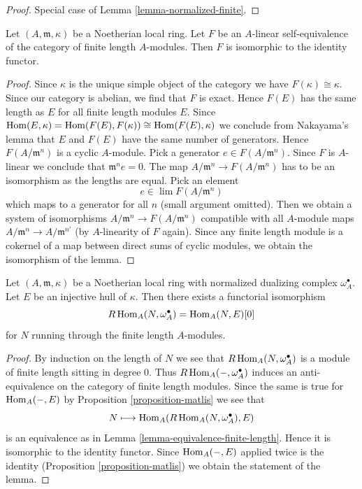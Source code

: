 \begin{proof}
Special case of Lemma \ref{lemma-normalized-finite}.
\end{proof}

\begin{lemma}
\label{lemma-equivalence-finite-length}
Let $(A, \mathfrak m, \kappa)$ be a Noetherian local
ring. Let $F$ be an $A$-linear self-equivalence of the category of
finite length $A$-modules. Then $F$ is isomorphic to the identity functor.
\end{lemma}

\begin{proof}
Since $\kappa$ is the unique simple object of the category we have
$F(\kappa) \cong \kappa$. Since our category is abelian, we find that
$F$ is exact. Hence $F(E)$ has the same length as $E$ for all finite
length modules $E$.
Since $\mathop{\mathrm{Hom}}\nolimits(E, \kappa) = \mathop{\mathrm{Hom}}\nolimits(F(E), F(\kappa)) \cong \mathop{\mathrm{Hom}}\nolimits(F(E), \kappa)$
we conclude from Nakayama's lemma that $E$ and $F(E)$ have the same
number of generators. Hence $F(A/\mathfrak m^n)$ is a cyclic $A$-module.
Pick a generator $e \in F(A/\mathfrak m^n)$.
Since $F$ is $A$-linear we conclude that $\mathfrak m^n e = 0$.
The map $A/\mathfrak m^n \to F(A/\mathfrak m^n)$ has to be
an isomorphism as the lengths are equal. Pick an element
$$
e \in \lim F(A/\mathfrak m^n)
$$
which maps to a generator for all $n$ (small argument omitted).
Then we obtain a system of isomorphisms
$A/\mathfrak m^n \to F(A/\mathfrak m^n)$ compatible with all
$A$-module maps $A/\mathfrak m^n \to A/\mathfrak m^{n'}$ (by $A$-linearity
of $F$ again). Since any finite length module is a cokernel
of a map between direct sums of cyclic modules, we obtain the isomorphism
of the lemma.
\end{proof}

\begin{lemma}
\label{lemma-dualizing-finite-length}
Let $(A, \mathfrak m, \kappa)$ be a Noetherian local
ring with normalized dualizing complex $\omega_A^\bullet$.
Let $E$ be an injective hull of $\kappa$. Then there exists
a functorial isomorphism
$$
R\mathop{\mathrm{Hom}}\nolimits_A(N, \omega_A^\bullet) = \mathop{\mathrm{Hom}}\nolimits_A(N, E)[0]
$$
for $N$ running through the finite length $A$-modules.
\end{lemma}

\begin{proof}
By induction on the length of $N$ we see that $R\mathop{\mathrm{Hom}}\nolimits_A(N, \omega_A^\bullet)$
is a module of finite length sitting in degree $0$. Thus
$R\mathop{\mathrm{Hom}}\nolimits_A(-, \omega_A^\bullet)$ induces an anti-equivalence
on the category of finite length modules. Since the same is true
for $\mathop{\mathrm{Hom}}\nolimits_A(-, E)$ by Proposition \ref{proposition-matlis} we see that
$$
N \longmapsto \mathop{\mathrm{Hom}}\nolimits_A(R\mathop{\mathrm{Hom}}\nolimits_A(N, \omega_A^\bullet), E)
$$
is an equivalence as in Lemma \ref{lemma-equivalence-finite-length}.
Hence it is isomorphic to the identity functor.
Since $\mathop{\mathrm{Hom}}\nolimits_A(-, E)$ applied twice is the identity
(Proposition \ref{proposition-matlis}) we obtain
the statement of the lemma.
\end{proof}

